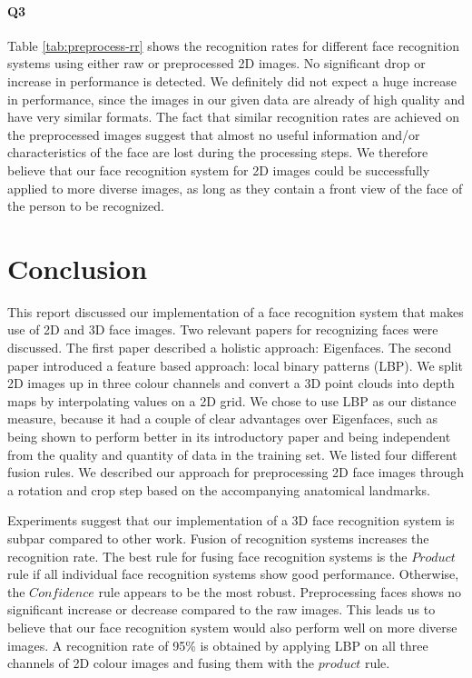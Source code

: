 \documentclass[]{article}
\begin{document}
\paragraph{Q3}
Table \ref{tab:preprocess-rr} shows the recognition rates for different face recognition systems using either raw or preprocessed 2D images. No significant drop or increase in performance is detected. We definitely did not expect a huge increase in performance, since the images in our given data are already of high quality and have very similar formats. The fact that similar recognition rates are achieved on the preprocessed images suggest that almost no useful information and/or characteristics of the face are lost during the processing steps. We therefore believe that our face recognition system for 2D images could be successfully applied to more diverse images, as long as they contain a front view of the face of the person to be recognized.

\section{Conclusion}
This report discussed our implementation of a face recognition system that makes use of 2D and 3D face images. Two relevant papers for recognizing faces were discussed. The first paper described a holistic approach: Eigenfaces. The second paper introduced a feature based approach: local binary patterns (LBP). We split 2D images up in three colour channels and convert a 3D point clouds into depth maps by interpolating values on a 2D grid. We chose to use LBP as our distance measure, because it had a couple of clear advantages over Eigenfaces, such as being shown to perform better in its introductory paper and being independent from the quality and quantity of data in the training set. We listed four different fusion rules. We described our approach for preprocessing 2D face images through a rotation and crop step based on the accompanying anatomical landmarks.

Experiments suggest that our implementation of a 3D face recognition system is subpar compared to other work. Fusion of recognition systems increases the recognition rate. The best rule for fusing face recognition systems is the $Product$ rule if all individual face recognition systems show good performance. Otherwise, the $Confidence$ rule appears to be the most robust. Preprocessing faces shows no significant increase or decrease compared to the raw images. This leads us to believe that our face recognition system would also perform well on more diverse images. A recognition rate of 95\% is obtained by applying LBP on all three channels of 2D colour images and fusing them with the $product$ rule.


\end{document}
